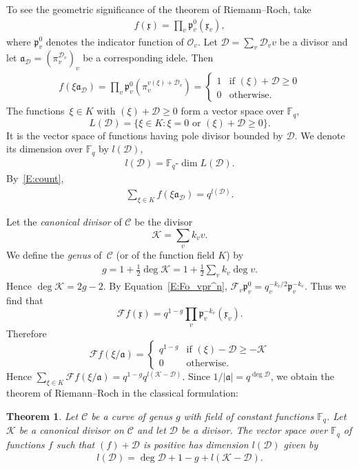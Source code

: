 \documentclass{amsart}
\newcommand\F{\mathbb{F}}
\newcommand\oo{\mathcal{O}}
\newcommand\Curve{\mathcal{C}}
\newcommand\pr{\mathfrak{p}}
\newcommand\Fo{\mathcal{F}}
\newcommand\x{\mathfrak{x}}	\newcommand\y{\mathfrak{y}}
\newcommand\calD{\mathcal{D}}	\newcommand\calK{\mathcal{K}}
\newcommand\gota{\mathfrak{a}}	\newcommand\gotb{\mathfrak{b}}
\newtheorem{theorem}{Theorem}[section]
\theoremstyle{definition}\newtheorem{definition}[theorem]{Definition}
\theoremstyle{remark}\newtheorem{remark}[theorem]{Remark}
\numberwithin{equation}{section}
\begin{document}
To see the geometric significance of the theorem of Riemann--Roch,
take
\begin{gather}\label{E:special f}
f(\x)=\prod_v \pr_v^0(\x_v),
\end{gather}
where $\pr_v^0$ denotes the indicator function of $\oo_v$.
Let $\calD=\sum_v\calD_vv$ be a divisor and let $\gota_\calD=\left(\pi_v^{\calD_v}\right)_v$ be a corresponding idele.
Then
\begin{gather}\label{E:count}
f(\xi\gota_\calD)=\prod_v\pr_v^0(\pi_v^{v(\xi)+\calD_v})
=\begin{cases}1&\text{if }(\xi)+\calD\geq0\\0&\text{otherwise.}\end{cases}
\end{gather}
The functions~\mbox{$\xi\in K$} with $(\xi)+\calD\geq0$ form a vector space over $\F_q$,
$$
L(\calD)=\{\xi\in K\colon\xi=0\text{ or }(\xi)+\calD\geq0\}.
$$
It is the vector space of functions having pole divisor bounded by $\calD$.
We denote its dimension over $\F_q$ by $l(\calD)$,
\begin{gather*}
l(\calD)={\F_q}\text{-}\dim L(\calD).
\end{gather*}
By~\eqref{E:count},
\begin{gather}\label{E:sum=l(D)}
\sum_{\xi\in K}f(\xi\gota_\calD)=q^{l(\calD)}.
\end{gather}

Let the {\em canonical divisor\/} of $\Curve$ be the divisor
$$
\calK=\sum_vk_vv.
$$
We define the {\em genus\/} of~$\Curve$ (or of the function field $K$) by
\begin{gather*}
g=1+{\frac12}{\deg\calK}=1+{\frac12}\sum_vk_v\deg v.
\end{gather*}
Hence $\deg\calK=2g-2$.
By Equation~\eqref{E:Fo_vpr^n},
$
\Fo_v \pr_v^0=q_v^{-k_v/2}\pr_v^{-k_v}
$.
Thus we find that
$$
\Fo f(\x)=q^{1-g}\prod_v{\pr_v^{-k_v}}(\x_v).
$$
Therefore
$$
\Fo f(\xi/\gota)=\begin{cases}
q^{1-g}	&\text{if }(\xi)-\calD\geq-\calK\\
0	&\text{otherwise.}
\end{cases}
$$
Hence $\sum_{\xi\in K}\Fo f(\xi/\gota)=q^{1-g}q^{l(\calK-\calD)}$.
Since $1/|\gota|=q^{\deg\calD}$,
we obtain the theorem of Riemann--Roch in the classical formulation:

\begin{theorem}\label{T: RR}
Let\/ $\Curve$ be a curve of genus\/ $g$ with field of constant functions\/ $\F_q$.
Let\/~$\calK$ be a canonical divisor on\/ $\Curve$ and let\/ $\calD$ be a divisor.
The vector space over\/ $\F_q$ of functions\/ $f$ such that\/ $(f)+\calD$ is positive has dimension\/ $l(\calD)$ given by
\begin{gather*}
l(\calD)=\deg \calD+1-g+l(\calK-\calD).
\end{gather*}
\end{theorem}
\end{document}
